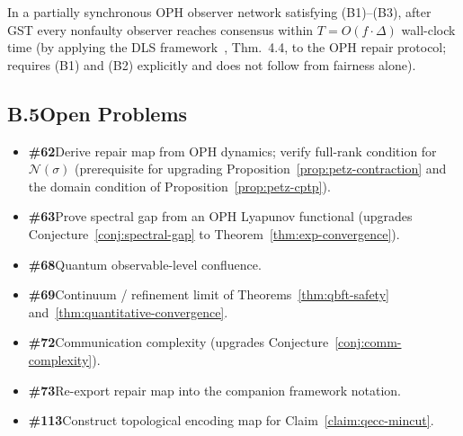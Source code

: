 \begin{theorem}
\label{thm:quantitative-convergence}
In a partially synchronous \textrm{OPH} observer network satisfying
(B1)--(B3), after \textrm{GST} every nonfaulty observer reaches consensus
within $T=O(f\cdot\Delta)$ wall-clock time
(by applying the \textrm{DLS} framework~\cite{DLS88}, Thm.~4.4,
to the \textrm{OPH} repair protocol;
requires (B1) and (B2) explicitly and does not follow from fairness alone).
\end{theorem}

\subsection*{B.5\quad Open Problems}

\begin{itemize}
  \item \textbf{\#62}\enspace Derive repair map from OPH dynamics;
        verify full-rank condition for $\mathcal{N}(\sigma)$
        (prerequisite for upgrading Proposition~\ref{prop:petz-contraction}
        and the domain condition of Proposition~\ref{prop:petz-cptp}).
  \item \textbf{\#63}\enspace Prove spectral gap from an OPH Lyapunov
        functional (upgrades Conjecture~\ref{conj:spectral-gap} to
        Theorem~\ref{thm:exp-convergence}).
  \item \textbf{\#68}\enspace Quantum observable-level confluence.
  \item \textbf{\#69}\enspace Continuum / refinement limit of
        Theorems~\ref{thm:qbft-safety} and~\ref{thm:quantitative-convergence}.
  \item \textbf{\#72}\enspace Communication complexity
        (upgrades Conjecture~\ref{conj:comm-complexity}).
  \item \textbf{\#73}\enspace Re-export repair map into the companion framework notation.
  \item \textbf{\#113}\enspace Construct topological encoding map for
        Claim~\ref{claim:qecc-mincut}.
\end{itemize}

